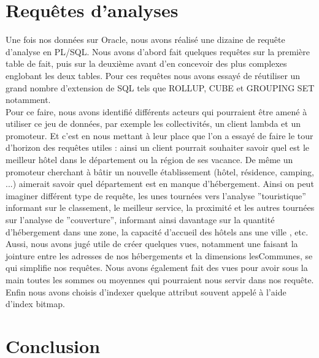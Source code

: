 \documentclass[a4paper,sffamily,12pt]{article}
\begin{document}
		\vspace{0.5cm}
			
	\section{Requêtes d'analyses}

		\vspace{0.5cm}
		
		Une fois nos données sur Oracle, nous avons réalisé une dizaine de requête d'analyse en PL/SQL. Nous avons d'abord fait quelques requêtes sur la première table de fait, puis sur la deuxième avant d'en concevoir des plus complexes englobant les deux tables. Pour ces requêtes nous avons essayé de réutiliser un grand nombre d'extension de SQL tels que ROLLUP, CUBE et GROUPING SET notamment. \\		
		
		Pour ce faire, nous avons identifié différents acteurs qui pourraient être amené à utiliser ce jeu de données, par exemple les collectivités, un client lambda et un promoteur. Et c'est en nous mettant à leur place que l'on a essayé de faire le tour d'horizon des requêtes utiles : ainsi un client pourrait souhaiter savoir quel est le meilleur hôtel dans le département ou la région de ses vacance. De même un promoteur cherchant à bâtir un nouvelle établissement (hôtel, résidence, camping, ...) aimerait savoir quel département est en manque d'hébergement. Ainsi on peut imaginer différent type de requête, les unes tournées vers l'analyse ''touristique'' informant sur le classement, le meilleur service, la proximité et les autres tournées sur l'analyse de ''couverture'', informant ainsi davantage sur la quantité d'hébergement dans une zone, la capacité d'accueil des hôtels ans une ville , etc. \\
		
		Aussi, nous avons jugé utile de créer quelques vues, notamment une faisant la jointure entre les adresses de nos hébergements et la dimensions lesCommunes, se qui simplifie nos requêtes. Nous avons également fait des vues pour avoir sous la main toutes les sommes ou moyennes qui pourraient nous servir dans nos requête. Enfin nous avons choisis d'indexer quelque attribut souvent appelé à l'aide d'index bitmap. \\
		
		\vspace{0.5cm}
																
	\section{Conclusion}
\end{document}
